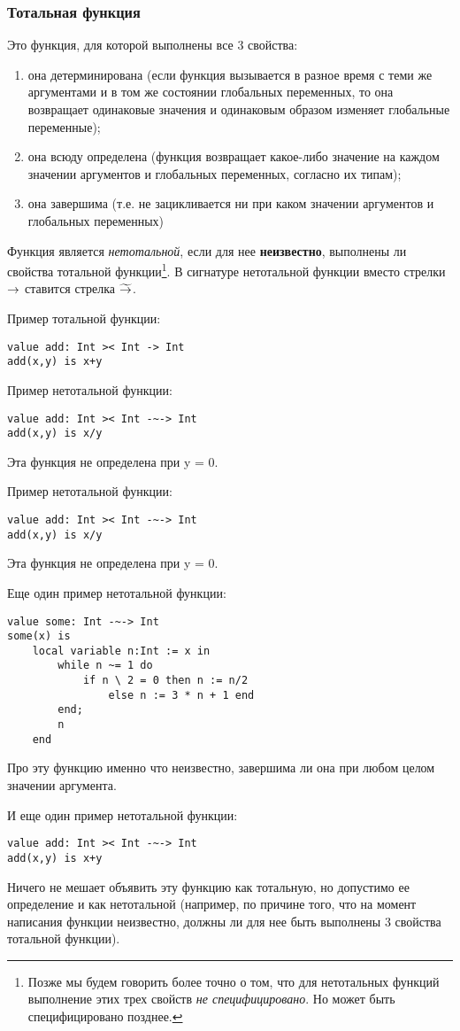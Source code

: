 \documentclass[14pt, twoside]{extreport}
\newcommand{\head}[1]{\vspace{1cm}\subsubsection*{#1}}
\begin{document}
\head{Тотальная функция}
Это функция, для которой выполнены все 3 свойства:
\begin{enumerate}
  \item она детерминирована (если функция вызывается в разное время с теми же аргументами и в том же состоянии глобальных переменных, то она возвращает одинаковые значения и одинаковым образом изменяет глобальные переменные);
  \item она всюду определена (функция возвращает какое-либо значение на каждом значении аргументов и глобальных переменных, согласно их типам);
  \item она завершима (т.е. не зацикливается ни при каком значении аргументов и глобальных переменных)
\end{enumerate}
Функция является \emph{нетотальной}, если для нее \textbf{неизвестно}, выполнены ли свойства тотальной функции\footnote{Позже мы будем говорить более точно о том, что для нетотальных функций выполнение этих трех свойств \emph{не специфицировано}. Но может быть специфицировано позднее.}. В сигнатуре нетотальной функции вместо стрелки $\rightarrow$ ставится стрелка $\widetilde{\rightarrow}$.

Пример тотальной функции:
\begin{lstlisting}
value add: Int >< Int -> Int
add(x,y) is x+y
\end{lstlisting}

Пример нетотальной функции:
\begin{lstlisting}
value add: Int >< Int -~-> Int
add(x,y) is x/y
\end{lstlisting}
Эта функция не определена при y = 0.

Пример нетотальной функции:
\begin{lstlisting}
value add: Int >< Int -~-> Int
add(x,y) is x/y
\end{lstlisting}
Эта функция не определена при y = 0.

Еще один пример нетотальной функции:
\begin{lstlisting}
value some: Int -~-> Int
some(x) is
    local variable n:Int := x in
        while n ~= 1 do
            if n \ 2 = 0 then n := n/2
                else n := 3 * n + 1 end
        end;
        n
    end
\end{lstlisting}
Про эту функцию именно что неизвестно, завершима ли она при любом целом значении аргумента.

И еще один пример нетотальной функции:
\begin{lstlisting}
value add: Int >< Int -~-> Int
add(x,y) is x+y
\end{lstlisting}
Ничего не мешает объявить эту функцию как тотальную, но допустимо ее определение и как нетотальной (например, по причине того, что на момент написания функции неизвестно, должны ли для нее быть выполнены 3 свойства тотальной функции).
\end{document}
